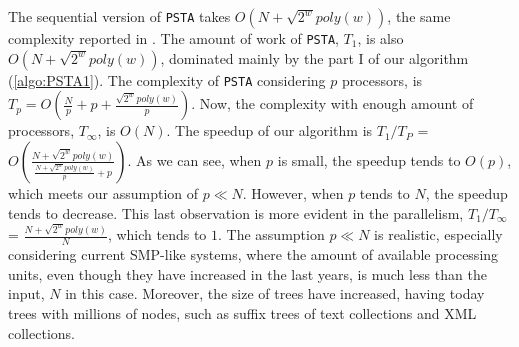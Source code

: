 The sequential version of {\tt PSTA} takes $O(N+\sqrt{2^{w}}poly(w))$, the same complexity reported in \cite{Navarro:2014:FFS:2620785.2601073}. The amount of work of {\tt PSTA}, $T_1$, is also $O(N+\sqrt{2^{w}}poly(w))$, dominated mainly by the part I of our algorithm (\ref{algo:PSTA1}). The complexity of {\tt PSTA} considering $p$ processors, is $T_p = O(\frac{N}{p}+p+\frac{\sqrt{2^{w}}poly(w)}{p})$. Now, the complexity with enough amount of processors, $T_\infty$, is $O(N)$. The speedup of our algorithm is $T_1/T_P$ = $O(\frac{N+\sqrt{2^{w}}poly(w)}{\frac{N+\sqrt{2^{w}}poly(w)}{p}+p})$. As we can see, when $p$ is small, the speedup tends to $O(p)$, which meets our assumption of $p\ll N$. However, when $p$ tends to $N$, the speedup tends to decrease. This last observation is more evident in the parallelism, $T_1/T_{\infty}$ = $\frac{N+\sqrt{2^{w}}poly(w)}{N}$, which tends to $1$. The assumption $p\ll N$ is realistic, especially considering current SMP-like systems, where the amount of available processing units, even though they have increased in the last years, is much less than the input, $N$ in this case. Moreover, the size of trees have increased, having today trees with millions of nodes, such as suffix trees of text collections and XML collections.

